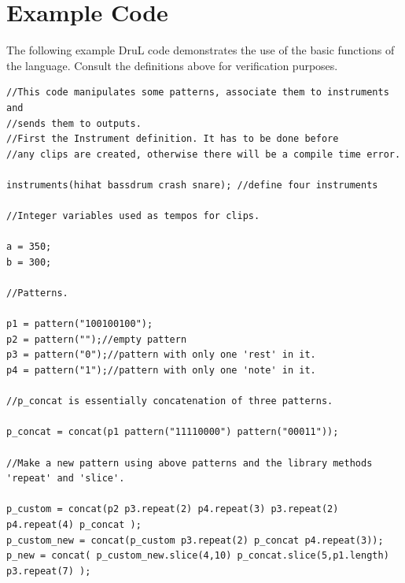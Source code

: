 \documentclass[11pt,twoside]{article}
\begin{document}
\clearpage

\section{Example Code}

The following example DruL code demonstrates the use of the basic functions of the language.
Consult the definitions above for verification purposes.

\begin{verbatim}
//This code manipulates some patterns, associate them to instruments and
//sends them to outputs.
//First the Instrument definition. It has to be done before 
//any clips are created, otherwise there will be a compile time error.

instruments(hihat bassdrum crash snare); //define four instruments

//Integer variables used as tempos for clips.

a = 350;
b = 300;

//Patterns.

p1 = pattern("100100100");
p2 = pattern("");//empty pattern
p3 = pattern("0");//pattern with only one 'rest' in it.
p4 = pattern("1");//pattern with only one 'note' in it.

//p_concat is essentially concatenation of three patterns.

p_concat = concat(p1 pattern("11110000") pattern("00011"));

//Make a new pattern using above patterns and the library methods 'repeat' and 'slice'. 

p_custom = concat(p2 p3.repeat(2) p4.repeat(3) p3.repeat(2) p4.repeat(4) p_concat );
p_custom_new = concat(p_custom p3.repeat(2) p_concat p4.repeat(3));
p_new = concat( p_custom_new.slice(4,10) p_concat.slice(5,p1.length) p3.repeat(7) );

\end{verbatim}
\clearpage
\end{document}
